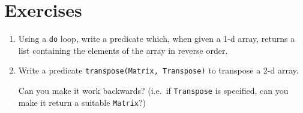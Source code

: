 \section{Exercises}

\begin{enumerate}

\item

Using a \texttt{do} loop, write a predicate which, when given a 1-d array,
returns a list containing the elements of the array in reverse order.


\item

Write a predicate \texttt{transpose(Matrix, Transpose)} to transpose a 2-d
array.

Can you make it work backwards?  (i.e.\ if \texttt{Transpose} is specified,
can you make it return a suitable \texttt{Matrix}?)

\end{enumerate}

